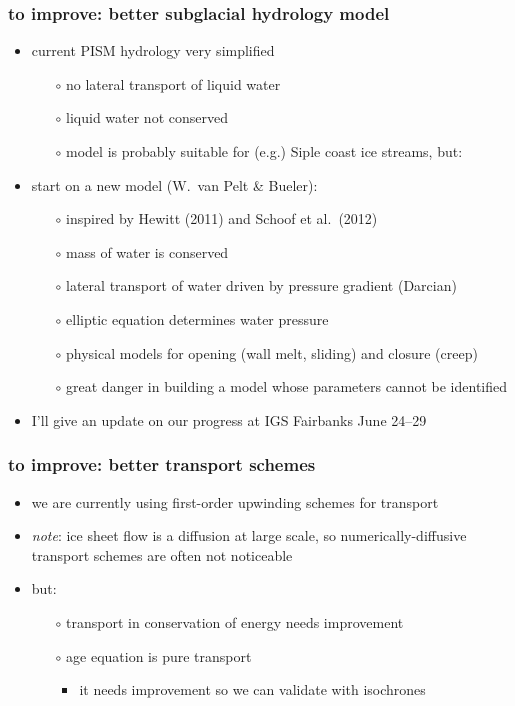 \documentclass[hide notes,intlimits]{beamer}
\begin{document}
\begin{frame}
  \frametitle{to improve: better subglacial hydrology model}
  \begin{itemize}
  \item current PISM hydrology very simplified
    \begin{itemize}
    \item[$\circ$] no lateral transport of liquid water
    \item[$\circ$] liquid water not conserved
    \item[$\circ$] model is probably suitable for (e.g.) Siple coast ice streams, \alert{but}:
    \end{itemize}
  \item start on a new model (W.~van Pelt \& Bueler):
    \begin{itemize}
    \item[$\circ$] inspired by Hewitt (2011) and Schoof et al.~(2012)
    \item[$\circ$] mass of water is conserved
    \item[$\circ$] lateral transport of water driven by pressure gradient (Darcian)
    \item[$\circ$] elliptic equation determines water pressure
    \item[$\circ$] physical models for opening (wall melt, sliding) and closure (creep)
    \item[$\circ$] \alert{great danger} in building a model whose parameters cannot be identified
    \end{itemize}
  \item I'll give an update on our progress at IGS Fairbanks June 24--29
  \end{itemize}
\end{frame}


\begin{frame}
  \frametitle{to improve: better transport schemes}
  \begin{itemize}
  \item we are currently using first-order upwinding schemes for transport
  \item \emph{note}: ice sheet flow is a diffusion at large scale, so numerically-diffusive transport schemes are often not noticeable
  \item \alert{but}:
    \begin{itemize}
    \item[$\circ$] transport in conservation of energy needs improvement
    \item[$\circ$] age equation is pure transport
      \begin{itemize}
      \item it needs improvement so we can validate with isochrones
      \end{itemize}
    \end{itemize}
  \end{itemize}
\end{frame}
\end{document}
